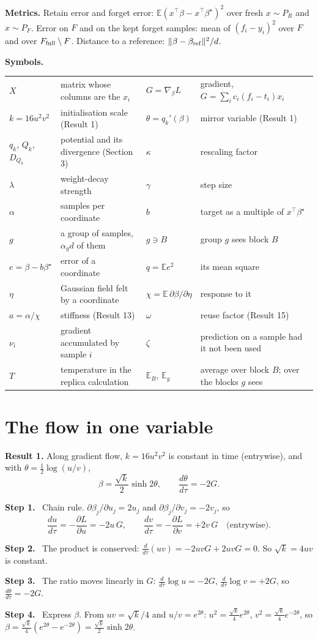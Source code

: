 \documentclass[10pt]{article}
\newcommand{\bs}{\beta^\star}\newcommand{\E}{\mathbb E}\newcommand{\asinh}{\operatorname{arcsinh}}\newcommand{\sk}{\sqrt k}
\newcommand{\step}[1]{\par\smallskip\textbf{Step #1.}\ }
\begin{document}
\textbf{Metrics.} Retain error and forget error: $\E(x^\top\beta-x^\top\bs)^2$ over fresh $x\sim P_R$ and $x\sim P_F$. Error on $F$ and on the kept forget samples: mean of $(f_i-y_i)^2$ over $F$ and over $F_{\rm full}\setminus F$. Distance to a reference: $\|\beta-\beta_{\rm ref}\|^2/d$.

\textbf{Symbols.}
\begin{center}\footnotesize\begin{tabular}{@{}ll@{\quad}ll@{}}\toprule
$X$ & matrix whose columns are the $x_i$ & $G=\nabla_\beta L$ & gradient, $G=\sum_ic_i(f_i-t_i)x_i$\\
$k=16u^2v^2$ & initialisation scale (Result 1) & $\theta=q_k'(\beta)$ & mirror variable (Result 1)\\
$q_k$, $Q_k$, $D_{Q_k}$ & potential and its divergence (Section 3) & $\kappa$ & rescaling factor\\
$\lambda$ & weight-decay strength & $\gamma$ & step size\\
$\alpha$ & samples per coordinate & $b$ & target as a multiple of $x^\top\bs$\\
$g$ & a group of samples, $\alpha_gd$ of them & $g\ni B$ & group $g$ sees block $B$\\
$e=\beta-b\bs$ & error of a coordinate & $q=\E e^2$ & its mean square\\
$\eta$ & Gaussian field felt by a coordinate & $\chi=\E\,\partial\beta/\partial\eta$ & response to it\\
$a=\alpha/\chi$ & stiffness (Result 13) & $\omega$ & reuse factor (Result 15)\\
$\nu_i$ & gradient accumulated by sample $i$ & $\zeta$ & prediction on a sample had it not been used\\
$T$ & temperature in the replica calculation & $\E_B$, $\E_g$ & average over block $B$; over the blocks $g$ sees\\\bottomrule
\end{tabular}\end{center}

\section{The flow in one variable}
\textbf{Result 1.} Along gradient flow, $k=16u^2v^2$ is constant in time (entrywise), and with $\theta=\frac12\log(u/v)$,
\begin{equation}\label{mf}
\beta=\frac{\sk}2\sinh2\theta,\qquad\frac{d\theta}{d\tau}=-2G .
\end{equation}
\step1 Chain rule. $\partial\beta_j/\partial u_j=2u_j$ and $\partial\beta_j/\partial v_j=-2v_j$, so
\[
\frac{du}{d\tau}=-\frac{\partial L}{\partial u}=-2u\,G,\qquad\frac{dv}{d\tau}=-\frac{\partial L}{\partial v}=+2v\,G\quad\text{(entrywise).}
\]
\step2 The product is conserved: $\frac{d}{d\tau}(uv)=-2uvG+2uvG=0$. So $\sk=4uv$ is constant.
\step3 The ratio moves linearly in $G$: $\frac{d}{d\tau}\log u=-2G$, $\frac{d}{d\tau}\log v=+2G$, so $\frac{d\theta}{d\tau}=-2G$.
\step4 Express $\beta$. From $uv=\sk/4$ and $u/v=e^{2\theta}$: $u^2=\frac{\sk}4e^{2\theta}$, $v^2=\frac{\sk}4e^{-2\theta}$, so $\beta=\frac{\sk}4(e^{2\theta}-e^{-2\theta})=\frac{\sk}2\sinh2\theta$.
\end{document}
